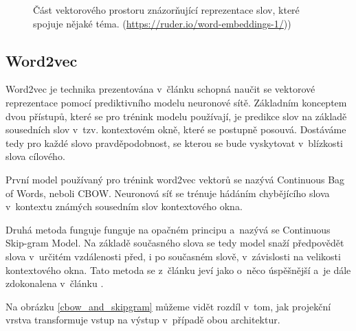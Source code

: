 \begin{figure}[hbt]
	\centering
	\caption{Část vektorového prostoru znázorňující reprezentace slov, které spojuje nějaké téma. (\url{https://ruder.io/word-embeddings-1/}))}
	\label{word_embeddings}
\end{figure}

\subsection{Word2vec}

Word2vec je technika prezentována v~článku \cite{mikolov2013embeddings} schopná naučit se vektorové reprezentace pomocí prediktivního modelu neuronové sítě. Základním konceptem dvou přístupů, které se pro trénink modelu používají, je predikce slov na základě sousedních slov v~tzv. kontextovém okně, které se postupně posouvá. Dostáváme tedy pro každé slovo pravděpodobnost, se kterou se bude vyskytovat v~blízkosti slova cílového.\par
První model používaný pro trénink word2vec vektorů se nazývá Continuous Bag of Words, neboli CBOW. Neuronová síť se trénuje hádáním chybějícího slova v~kontextu známých sousedním slov kontextového okna.\par
Druhá metoda funguje funguje na opačném principu a~nazývá se Continuous Skip-gram Model. Na základě současného slova se tedy model snaží předpovědět slova v~určitém vzdálenosti před, i po současném slově, v~závislosti na velikosti kontextového okna. Tato metoda se z~článku \cite{mikolov2013embeddings} jeví jako o~něco úspěšnější a~je dále zdokonalena v~článku \cite{mikolov2013_2}.\par
Na obrázku \ref{cbow_and_skipgram} můžeme vidět rozdíl v~tom, jak projekční vrstva transformuje vstup na výstup v~případě obou architektur.

